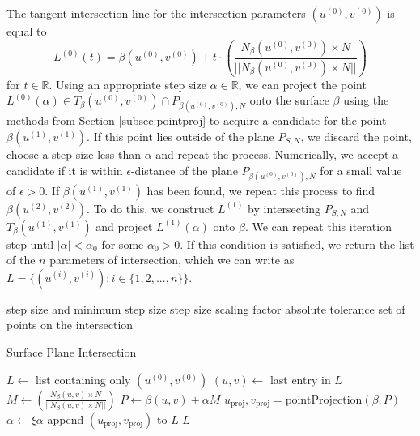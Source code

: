 \documentclass[a4paper, 11pt]{report}
\theoremstyle{definition}
\newcommand{\Desc}[2]{\State \makebox[12em][l]{#1}#2}
\begin{document}
	The tangent intersection line for the intersection parameters $(u^{(0)}, v^{(0)})$ is equal to
		$$ L^{(0)}(t) = \beta(u^{(0)}, v^{(0)}) + t \cdot \left(\frac{N_{\beta}(u^{(0)}, v^{(0)}) \times N}{||N_{\beta}(u^{(0)}, v^{(0)}) \times N||}\right)$$
	for $t \in \mathbb{R}$. Using an appropriate step size $\alpha \in \mathbb{R}$, we can project the point $L^{(0)}(\alpha) \in T_{\beta}(u^{(0)}, v^{(0)}) \cap P_{\beta(u^{(0)}, v^{(0)}), N}$ onto the surface $\beta$ using the methods from Section \ref{subsec:pointproj} to acquire a candidate for the point $\beta(u^{(1)}, v^{(1)})$. If this point lies outside of the plane $P_{S,N}$, we discard the point, choose a step size less than $\alpha$ and repeat the process. Numerically, we accept a candidate if it is within $\epsilon$-distance of the plane $P_{\beta(u^{(0)}, v^{(0)}), N}$ for a small value of $\epsilon > 0$. If $\beta(u^{(1)}, v^{(1)})$ has been found, we repeat this process to find $\beta(u^{(2)}, v^{(2)})$. To do this, we construct $L^{(1)}$ by intersecting $P_{S,N}$ and $T_{\beta}(u^{(1)}, v^{(1)})$ and project $L^{(1)}(\alpha)$ onto $\beta$. We can repeat this iteration step until $|\alpha| < \alpha_0$ for some $\alpha_0 > 0$. If this condition is satisfied, we return the list of the $n$ parameters of intersection, which we can write as $L = \{(u^{(i)}, v^{(i)}): i \in \{1,2,...,n\}\}$.

	\begin{algorithm}[H]
	\begin{algorithmic}[1]
		\Input
			\Desc{$\alpha > \alpha_0$}{\phantom{aa} step size and minimum step size}
			\Desc{$\xi < 1$}{\phantom{aa} step size scaling factor}
			\Desc{$\epsilon$}{\phantom{aa} absolute tolerance}
		\EndInput
		\Output
			\Desc{$\{(u^{(i)}, v^{(i)}) : i \in \{1, 2, ..., n\}\}$ }{\phantom{aa} set of points on the intersection}
		\EndOutput

		\caption{Surface Plane Intersection}\label{alg:surfplaneintersection}
			\State $L \gets$ list containing only $(u^{(0)}, v^{(0)})$
				\State $(u,v) \gets$ last entry in $L$
				\State $M \gets \left(\frac{N_{\beta}(u, v) \times N}{||N_{\beta}(u, v) \times N||}\right)$
				\State $P \gets \beta(u,v) + \alpha M$
				\State $u_\textrm{proj}, v_\textrm{proj} = \textrm{pointProjection}(\beta, P)$
					$\alpha \gets \xi\alpha$
				\Else {} append $(u_\textrm{proj}, v_\textrm{proj})$ to $L$
				\EndIf
			\EndWhile
			\State \Return $L$
		\EndProcedure
	\end{algorithmic}
	\end{algorithm}
\end{document}

